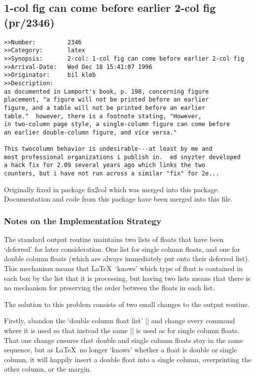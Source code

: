 \documentclass{ltxguide}
\newcommand\Lpack[1]{\textsf{#1}}
\begin{document}
\subsection{1-col fig can come before earlier 2-col fig
           (pr/2346)}

\begin{verbatim}
>>Number:         2346
>>Category:       latex
>>Synopsis:       2-col: 1-col fig can come before earlier 2-col fig
>>Arrival-Date:   Wed Dec 18 15:41:07 1996
>>Originator:     bil kleb
>>Description:
as documented in Lamport's book, p. 198, concerning figure
placement, "a figure will not be printed before an earlier
figure, and a table will not be printed before an earlier
table."  however, there is a footnote stating, "However,
in two-column page style, a single-column figure can come before
an earlier double-column figure, and vice versa."

This twocolumn behavior is undesirable---at least by me and
most professional organizations i publish in.  ed snyzter developed
a hack fix for 2.09 several years ago which links the two
counters, but i have not run across a similar "fix" for 2e...
\end{verbatim}

Originally fixed in package \Lpack{fix2col} which was merged into
this package. Documentation and code from this package have been
merged into this file.

\subsubsection{Notes on the Implementation Strategy}

The standard output routine maintains two lists of floats that have
been `deferred' for later consideration. One list for single column
floats, and one for double column floats (which are always
immediately put onto their deferred list). This mechanism means
that \LaTeX\ `knows' which type of float is contained in each box
by the list that it is processing, but having two lists means
that there is no mechanism for preserving the order between the
floats in each list.

The solution to this problem consists of two small changes to
the output routine.

Firstly, abandon the `double column float list' |\@dbldeferlist|
and change every command where it is used so that instead the
same |\@deferlist| is used as for single column floats.
That one change ensures that double and single column floats
stay in the same sequence, but as \LaTeX\ no longer `knows'
whether a float is double or single column, it will happily
insert a double float into a single column, overprinting the
other column, or the margin.
\end{document}
